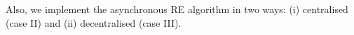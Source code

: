 \documentclass{rspublic}
\newcommand{\alnote}[1]{ {\textcolor{blue} { ***andre: #1 }}}
\newcommand{\athotanote}[1]{ {\textcolor{green} { ***athota: #1 }}}
\newcommand{\alnote}[1]{}
\newcommand{\athotanote}[1]{}
\begin{document}



Also, we implement the asynchronous RE algorithm in two ways: (i) centralised (case II) and (ii) decentralised (case III).
\end{document}
